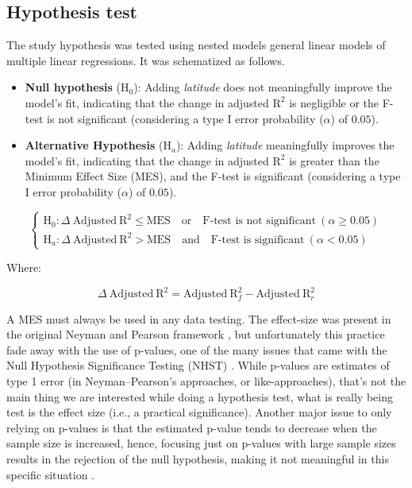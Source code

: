 \documentclass[
12pt,
openright,
oneside,
a4paper,
chapter=TITLE,
section=TITLE,
french,
spanish,
brazil,
english
]{abntex2}\usepackage{array}
\begin{document}
\subsection{Hypothesis test}\label{hypothesis-test}

The study hypothesis was tested using nested models general linear
models of multiple linear regressions. It was schematized as follows.

\begin{itemize}
\item
  \textbf{Null hypothesis} (\(\text{H}_{0}\)): Adding \emph{latitude}
  does not meaningfully improve the model's fit, indicating that the
  change in adjusted \(\text{R}^{2}\) is negligible or the F-test is not
  significant (considering a type I error probability (\(\alpha\)) of
  \(0.05\)).
\item
  \textbf{Alternative Hypothesis} (\(\text{H}_{a}\)): Adding
  \emph{latitude} meaningfully improves the model's fit, indicating that
  the change in adjusted \(\text{R}^{2}\) is greater than the Minimum
  Effect Size (MES), and the F-test is significant (considering a type I
  error probability (\(\alpha\)) of \(0.05\)).
\end{itemize}

\[
\begin{cases}
\text{H}_{0}: \Delta \ \text{Adjusted} \ \text{R}^{2} \leq \text{MES} \quad \text{or} \quad \text{F-test is not significant} \ (\alpha \geq 0.05) \\
\text{H}_{a}: \Delta \ \text{Adjusted} \ \text{R}^{2} > \text{MES} \quad \text{and} \quad \text{F-test is significant} \ (\alpha < 0.05)
\end{cases}
\]

Where:

\[
\Delta \ \text{Adjusted} \ \text{R}^{2} = \text{Adjusted} \ \text{R}^{2}_{f} - \text{Adjusted} \ \text{R}^{2}_{r}
\]

A MES must always be used in any data testing. The effect-size was
present in the original Neyman and Pearson framework
\autocite{neyman1928,neyman1928a}, but unfortunately this practice fade
away with the use of p-values, one of the many issues that came with the
Null Hypothesis Significance Testing (NHST)
\autocite{perezgonzalez2015}. While p-values are estimates of type 1
error (in Neyman--Pearson's approaches, or like-approaches), that's not
the main thing we are interested while doing a hypothesis test, what is
really being test is the effect size (i.e., a practical significance).
Another major issue to only relying on p-values is that the estimated
p-value tends to decrease when the sample size is increased, hence,
focusing just on p-values with large sample sizes results in the
rejection of the null hypothesis, making it not meaningful in this
specific situation \autocite{lin2013,mariscal2021}.
\end{document}
